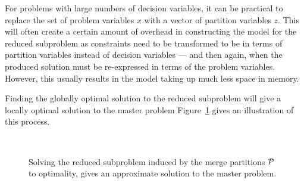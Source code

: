 \documentclass[authoryear,11pt,square,number,times,super,comma]{elsarticle}
\begin{document}
For problems with large numbers of decision variables, it can be practical to replace the set of problem variables $x$ with a vector of partition variables $z$. This will often create a certain amount of overhead in constructing the model for the reduced subproblem as constraints need to be transformed to be in terms of partition variables instead of decision variables --- and then again, when the produced solution must be re-expressed in terms of the problem variables. However, this usually results in the model taking up much less space in memory.

Finding the globally optimal solution to the reduced subproblem will give a locally optimal solution to the master problem Figure~\ref{fig:merge-solve} gives an illustration of this process.

\begin{figure}[h]
	\centering
	\qquad \qquad 
	\\ 
	\qquad \qquad 
	\caption[Solving the reduced subproblem gives an approximate solution to the master problem]{Solving the reduced subproblem induced by the merge partitions ${\cal P}$ to optimality, gives an approximate solution to the master problem.} 
    \label{fig:merge-solve}
\end{figure}
\end{document}
